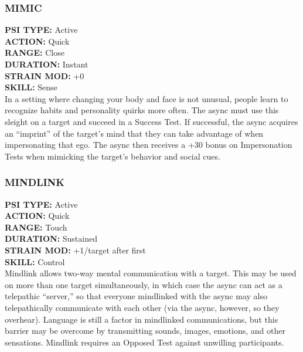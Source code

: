 \subsubsection{MIMIC}
\textbf{PSI TYPE:} Active \\ 
\textbf{ACTION:} Quick \\ 
\textbf{RANGE:} Close \\ 
\textbf{DURATION:} Instant \\
\textbf{STRAIN MOD:} +0 \\ 
\textbf{SKILL:} Sense\\
In a setting where changing your body and face is
not unusual, people learn to recognize habits and
personality quirks more often. The async must use
this sleight on a target and succeed in a Success Test.
If successful, the async acquires an “imprint” of the
target’s mind that they can take advantage of when
impersonating that ego. The async then receives a +30
bonus on Impersonation Tests when mimicking the
target’s behavior and social cues.

\subsubsection{MINDLINK}
\textbf{PSI TYPE:} Active \\ 
\textbf{ACTION:} Quick \\ 
\textbf{RANGE:} Touch \\ 
\textbf{DURATION:} Sustained \\
\textbf{STRAIN MOD:} +1/target after first \\ 
\textbf{SKILL:} Control\\
Mindlink allows two-way mental communication
with a target. This may be used on more than one
target simultaneously, in which case the async can act
as a telepathic “server,” so that everyone mindlinked
with the async may also telepathically communicate
with each other (via the async, however, so they
overhear). Language is still a factor in mindlinked
communications, but this barrier may be overcome by
transmitting sounds, images, emotions, and other sensations.
Mindlink requires an Opposed Test against
unwilling participants.

